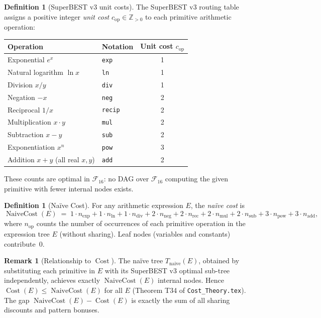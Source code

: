 \documentclass[12pt,a4paper]{article}
\theoremstyle{definition}
\newtheorem{definition}[theorem]{Definition}
\newtheorem{remark}[theorem]{Remark}
\newcommand{\Cost}{\operatorname{Cost}}
\newcommand{\NC}{\operatorname{NaiveCost}}
\newcommand{\Fam}{\mathcal{F}}
\begin{document}
\begin{definition}[SuperBEST v3 unit costs]
\label{def:unit-costs}
The SuperBEST v3 routing table assigns a positive integer \emph{unit cost}
$c_{\mathrm{op}} \in \mathbb{Z}_{>0}$ to each primitive arithmetic operation:
\begin{center}
\begin{tabular}{@{}llc@{}}
\toprule
\textbf{Operation} & \textbf{Notation} & \textbf{Unit cost $c_{\mathrm{op}}$} \\
\midrule
Exponential $e^x$            & \texttt{exp}   & 1 \\
Natural logarithm $\ln x$    & \texttt{ln}    & 1 \\
Division $x / y$             & \texttt{div}   & 1 \\
Negation $-x$                & \texttt{neg}   & 2 \\
Reciprocal $1/x$             & \texttt{recip} & 2 \\
Multiplication $x \cdot y$   & \texttt{mul}   & 2 \\
Subtraction $x - y$          & \texttt{sub}   & 2 \\
Exponentiation $x^n$         & \texttt{pow}   & 3 \\
Addition $x+y$ (all real $x,y$) & \texttt{add} & 2 \\
\bottomrule
\end{tabular}
\end{center}
These counts are optimal in $\Fam_{16}$: no DAG over $\Fam_{16}$ computing
the given primitive with fewer internal nodes exists.
\end{definition}

\begin{definition}[Na\"{i}ve Cost]
\label{def:NC}
For any arithmetic expression $E$, the \emph{na\"{i}ve cost} is
\[
  \NC(E)
  \;=\;
    1 \cdot n_{\exp}
  + 1 \cdot n_{\ln}
  + 1 \cdot n_{\mathrm{div}}
  + 2 \cdot n_{\mathrm{neg}}
  + 2 \cdot n_{\mathrm{rec}}
  + 2 \cdot n_{\mathrm{mul}}
  + 2 \cdot n_{\mathrm{sub}}
  + 3 \cdot n_{\mathrm{pow}}
  + 3 \cdot n_{\mathrm{add}},
\]
where $n_{\mathrm{op}}$ counts the number of occurrences of each primitive
operation in the expression tree $E$ (without sharing).  Leaf nodes (variables
and constants) contribute~$0$.
\end{definition}

\begin{remark}[Relationship to $\Cost$]
The na\"{i}ve tree $T_{\mathrm{naive}}(E)$, obtained by substituting each
primitive in $E$ with its SuperBEST v3 optimal sub-tree independently, achieves
exactly $\NC(E)$ internal nodes.  Hence $\Cost(E) \leq \NC(E)$ for all $E$
(Theorem T34 of \texttt{Cost\_Theory.tex}).  The gap $\NC(E) - \Cost(E)$ is
exactly the sum of all sharing discounts and pattern bonuses.
\end{remark}
\end{document}
